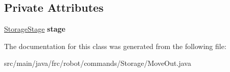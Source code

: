 \subsection*{Private Attributes}
\begin{DoxyCompactItemize}
\item 
\mbox{\label{classfrc_1_1robot_1_1commands_1_1_storage_1_1_move_out_a1a05461e88a5330c07542ddc7b0d06c1}} 
\mbox{\hyperlink{enumfrc_1_1robot_1_1enums_1_1_storage_stage}{Storage\+Stage}} {\bfseries stage}
\end{DoxyCompactItemize}


The documentation for this class was generated from the following file\+:\begin{DoxyCompactItemize}
\item 
src/main/java/frc/robot/commands/\+Storage/Move\+Out.\+java\end{DoxyCompactItemize}
